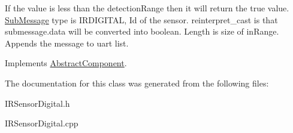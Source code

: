 If the value is less than the detection\+Range then it will return the true value. \hyperlink{struct_sub_message}{Sub\+Message} type is I\+R\+D\+I\+G\+I\+T\+AL, Id of the sensor. reinterpret\+\_\+cast is that submessage.\+data will be converted into boolean. Length is size of in\+Range. Appends the message to uart list. 

Implements \hyperlink{class_abstract_component}{Abstract\+Component}.



The documentation for this class was generated from the following files\+:\begin{DoxyCompactItemize}
\item 
I\+R\+Sensor\+Digital.\+h\item 
I\+R\+Sensor\+Digital.\+cpp\end{DoxyCompactItemize}
